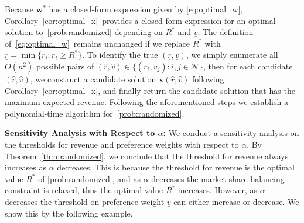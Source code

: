 \documentclass[mnsc,non-blindrev]{informs3}
\theoremstyle{definition}
\begin{document}
\vspace{0.5em}

Because $\bm{w}^*$ has a closed-form expression given by \eqref{eq:optimal_w}, Corollary~\ref{cor:optimal_x}~provides a closed-form expression for an optimal solution to~\ref{prob:randomized} depending on $R^*$ and $\underline{v}$. The definition of~\eqref{eq:optimal_w}~remains unchanged if we replace $R^*$ with \mbox{$\underline{r}=\min\{r_i:r_i\geq R^*\}$}. To identify the true $(\underline{r},\underline{v})$, we simply enumerate all $O(n^2)$ possible pairs of $(\hat{r},\hat{v})\in\{(r_i,v_j):i,j\in\mathcal{N}\}$, then for each candidate $(\hat{r},\hat{v})$, we construct a candidate solution $\bm{x}(\hat{r},\hat{v})$ following Corollary~\ref{cor:optimal_x}, and finally return the candidate solution that has the maximum expected revenue. Following the aforementioned steps we establish a polynomial-time algorithm for~\ref{prob:randomized}.

\noindent\textbf{Sensitivity Analysis with Respect to $\alpha$:} We conduct a sensitivity analysis on the thresholds for revenue and preference weights with respect to $\alpha$. By Theorem~\ref{thm:randomized}, we conclude that the threshold for revenue always increases as $\alpha$ decreases. This is because the threshold for revenue is the optimal value $R^*$ of \ref{prob:randomized}, and as $\alpha$ decreases the market share balancing constraint is relaxed, thus the optimal value $R^*$ increases. However, as $\alpha$ decreases the threshold on preference weight $\underline{v}$ can either increase or decrease. We show this by the following example.
\end{document}

